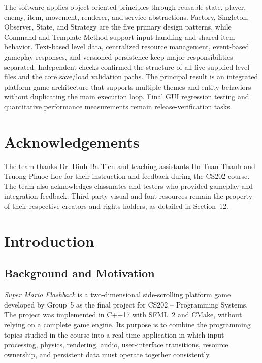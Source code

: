 \documentclass{template}
\newcommand{\GroupID}{5}
\newcommand{\CourseName}{CS202 -- Programming Systems}
\begin{document}
The software applies object-oriented principles through reusable state, player,
enemy, item, movement, renderer, and service abstractions. Factory, Singleton,
Observer, State, and Strategy are the five primary design patterns, while
Command and Template Method support input handling and shared item behavior.
Text-based level data, centralized resource management, event-based gameplay
responses, and versioned persistence keep major responsibilities separated.
Independent checks confirmed the structure of all five supplied level files
and the core save/load validation paths. The principal result is an integrated
platform-game architecture that supports multiple themes and entity behaviors
without duplicating the main execution loop. Final GUI regression testing and
quantitative performance measurements remain release-verification tasks.

\section*{Acknowledgements}

The team thanks Dr. Dinh Ba Tien and teaching assistants Ho Tuan Thanh and
Truong Phuoc Loc for their instruction and feedback during the CS202 course.
The team also acknowledges classmates and testers who provided gameplay and
integration feedback. Third-party visual and font resources remain the
property of their respective creators and rights holders, as detailed in
Section~12.

\clearpage
\tableofcontents
\clearpage
\listoffigures
{}
\listoftables
{}
\clearpage


\section{Introduction}

\subsection{Background and Motivation}

\textit{Super Mario Flashback} is a two-dimensional side-scrolling platform
game developed by Group~\GroupID{} as the final project for \CourseName. The
project was implemented in C++17 with SFML~2 and CMake, without relying on a
complete game engine. Its purpose is to combine the programming topics studied
in the course into a real-time application in which input processing, physics,
rendering, audio, user-interface transitions, resource ownership, and
persistent data must operate together consistently.
\end{document}
